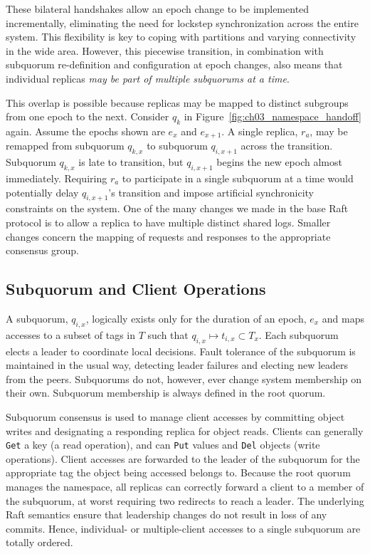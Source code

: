 These bilateral handshakes allow an epoch change to be implemented incrementally, eliminating the need for lockstep synchronization across the entire system.
This flexibility is key to coping with partitions and varying connectivity in the wide area.
However, this piecewise transition, in combination with subquorum re-definition and configuration at epoch changes, also means that individual replicas \emph{may be part of multiple subquorums at a time}.

This overlap is possible because replicas may be mapped to distinct subgroups from one epoch to the next.
Consider $q_k$ in Figure~\ref{fig:ch03_namespace_handoff} again.
Assume the epochs shown are $e_x$ and $e_{x+1}$.
A single replica, $r_a$, may be remapped from subquorum $q_{k,x}$ to subquorum $q_{i,x+1}$ across the transition.
Subquorum $q_{k,x}$ is late to transition, but $q_{i,x+1}$ begins the new epoch almost immediately.
Requiring $r_a$ to participate in a single subquorum at a time would potentially delay $q_{i,x+1}$'s transition and impose artificial synchronicity constraints on the system.
One of the many changes we made in the base Raft protocol is to allow a replica to have multiple distinct shared logs.
Smaller changes concern the mapping of requests and responses to the appropriate consensus group.

\subsection{Subquorum and Client Operations}
\label{ch03_client_operations}

A subquorum, $q_{i,x}$, logically exists only for the duration of an epoch, $e_x$ and maps accesses to a subset of tags in $T$ such that $q_{i,x} \mapsto t_{i,x} \subset T_x$.
Each subquorum elects a leader to coordinate local decisions.
Fault tolerance of the subquorum is maintained in the usual way, detecting leader failures and electing new leaders from the peers.
Subquorums do not, however, ever change system membership on their own.
Subquorum membership is always defined in the root quorum.

Subquorum consensus is used to manage client accesses by committing object writes and designating a responding replica for object reads.
Clients can generally \texttt{Get} a key (a read operation), and can \texttt{Put} values and \texttt{Del} objects (write operations).
Client accesses are forwarded to the leader of the subquorum for the appropriate tag the object being accessed belongs to.
Because the root quorum manages the namespace, all replicas can correctly forward a client to a member of the subquorum, at worst requiring two redirects to reach a leader.
The underlying Raft semantics ensure that leadership changes do not result in loss of any commits.
Hence, individual- or multiple-client accesses to a single subquorum are totally ordered.

